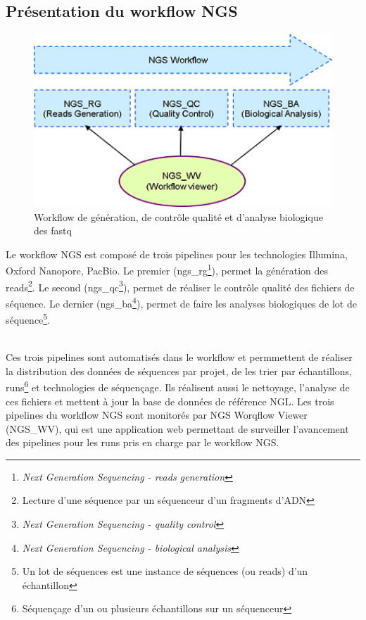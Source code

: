 \subsection{Présentation du workflow NGS}
\begin{minipage}{0.45\textwidth}
	\begin{figure}[H]
		\centering
		\includegraphics[width=1\textwidth]{img/Workflow.png}
		\caption{\footnotesize{Workflow de génération, de contrôle qualité et d’analyse biologique des fastq}}
		\label{worflow-genoscope}
	\end{figure}
\end{minipage} 
\hfill
\begin{minipage}{0.45\textwidth}
	Le workflow NGS est composé de trois pipelines pour les technologies Illumina, Oxford Nanopore, PacBio. Le premier (ngs\_rg\footnote{\emph{Next Generation Sequencing - reads generation}}), permet la génération des reads\footnote{Lecture d'une séquence par un séquenceur d'un fragments d'ADN}. Le second (ngs\_qc\footnote{\emph{Next Generation Sequencing - quality control}}), permet de réaliser le contrôle qualité des fichiers de séquence. Le dernier (ngs\_ba\footnote{\emph{Next Generation Sequencing - biological analysis}}), permet de faire les analyses biologiques de lot de séquence\footnote{Un lot de séquences est une instance de séquences (ou reads) d'un échantillon}. 
\end{minipage}\\[0.1cm]

Ces trois pipelines sont automatisés dans le workflow et permmettent de réaliser la distribution des données de séquences par projet, de les trier par échantillons, runs\footnote{Séquençage d'un ou plusieurs échantillons sur un séquenceur} et technologies de séquençage. Ils réalisent aussi le nettoyage, l'analyse de ces fichiers et mettent à jour la base de données de référence NGL. Les trois pipelines du workflow NGS sont monitorés par NGS Worqflow Viewer (NGS\_WV), qui est une application web permettant de surveiller l'avancement des pipelines pour les runs pris en charge par le workflow NGS.

